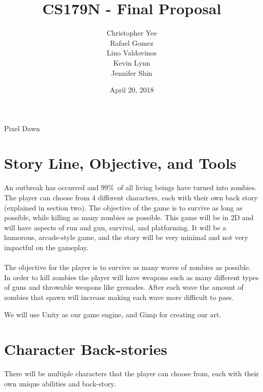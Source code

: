 \documentclass{article}
\title{CS179N - Final Proposal}
\author{Christopher Yee\\ Rafael Gomez \\Lino Valdovinos  \\Kevin Lynn \\Jennifer Shin }
\date{April 20, 2018}
\begin{document}
\maketitle 


\begin{center}
{\huge Pixel Dawn}
\end{center}


\section{Story Line, Objective, and Tools}

An outbreak has occurred and 99\%\ of all living beings have turned into zombies. The player can choose from 4 different characters, each with their own back story (explained in section two). The objective of the game is to survive as long as possible, while killing as many zombies as possible. This game will be in 2D and will have aspects of run and gun, survival, and platforming. It will be a humorous, arcade-style game, and the story will be very minimal and not very impactful on the gameplay.
\\\\
The objective for the player is to survive as many waves of zombies as possible. In order to kill zombies the player will have weapons such as many different types of guns and throwable weapons like grenades. After each wave the amount of zombies that spawn will increase making each wave more difficult to pass.

We will use Unity as our game engine, and Gimp for creating our art.

\section{Character Back-stories}
There will be multiple characters that the player can choose from, each with their own unique abilities and back-story.
\end{document}

